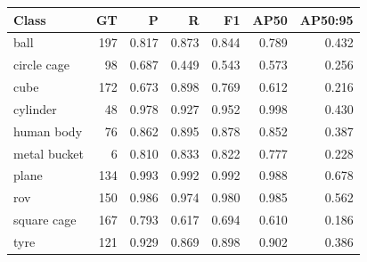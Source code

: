 \begin{tabular}{lrrrrrr}
\toprule
Class & GT & P & R & F1 & AP50 & AP50:95 \\
\midrule
ball & 197 & 0.817 & 0.873 & 0.844 & 0.789 & 0.432 \\
circle cage & 98 & 0.687 & 0.449 & 0.543 & 0.573 & 0.256 \\
cube & 172 & 0.673 & 0.898 & 0.769 & 0.612 & 0.216 \\
cylinder & 48 & 0.978 & 0.927 & 0.952 & 0.998 & 0.430 \\
human body & 76 & 0.862 & 0.895 & 0.878 & 0.852 & 0.387 \\
metal bucket & 6 & 0.810 & 0.833 & 0.822 & 0.777 & 0.228 \\
plane & 134 & 0.993 & 0.992 & 0.992 & 0.988 & 0.678 \\
rov & 150 & 0.986 & 0.974 & 0.980 & 0.985 & 0.562 \\
square cage & 167 & 0.793 & 0.617 & 0.694 & 0.610 & 0.186 \\
tyre & 121 & 0.929 & 0.869 & 0.898 & 0.902 & 0.386 \\
\bottomrule
\end{tabular}
